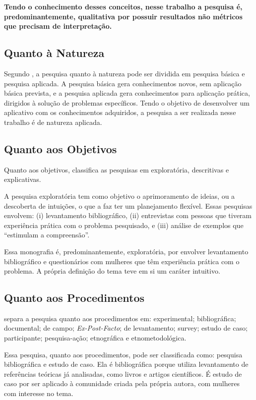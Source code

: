 \textbf{Tendo o conhecimento desses conceitos, nesse trabalho a pesquisa é, predominantemente, 
qualitativa por possuir resultados não métricos que precisam de interpretação.} 


\subsection{Quanto à Natureza}

Segundo , a pesquisa quanto à natureza pode ser dividida em pesquisa 
básica e pesquisa aplicada. A pesquisa básica gera conhecimentos novos, sem aplicação básica 
prevista, e a pesquisa aplicada gera conhecimentos para aplicação prática, dirigidos à solução de 
problemas específicos. Tendo o objetivo de desenvolver um aplicativo com os conhecimentos 
adquiridos, a pesquisa a ser realizada nesse trabalho é de natureza aplicada.

 
\subsection{Quanto aos Objetivos}

Quanto aos objetivos,  classifica as pesquisas em exploratória, 
descritivas e explicativas. 

A pesquisa exploratória tem como objetivo o aprimoramento 
de ideias, ou a descoberta de intuições, o que a faz ter um planejamento flexível. 
Essas pesquisas envolvem: (i) levantamento bibliográfico, (ii) entrevistas com pessoas 
que tiveram experiência prática com o problema pesquisado, e (iii) análise de exemplos que 
``estimulam a compreensão''.

Essa monografia é, predominantemente, exploratória, 
por envolver levantamento bibliográfico e questionários com mulheres que têm experiência 
prática com o problema. A própria definição do tema teve em si um caráter intuitivo. 

\subsection{Quanto aos Procedimentos}

 separa a pesquisa quanto aos 
procedimentos em: experimental; bibliográfica; 
documental; de campo; \emph{Ex-Post-Facto}; 
de levantamento; survey; estudo de caso; 
participante; pesquisa-ação; etnográfica e etnometodológica.

Essa pesquisa, quanto aos procedimentos, pode ser classificada como: pesquisa bibliográfica e 
estudo de caso.
Ela é bibliográfica porque utiliza levantamento de referências teóricas já analisadas, 
como livros e artigos científicos. É estudo de caso por 
ser aplicado à comunidade criada pela própria autora, com 
mulheres com interesse no tema.


